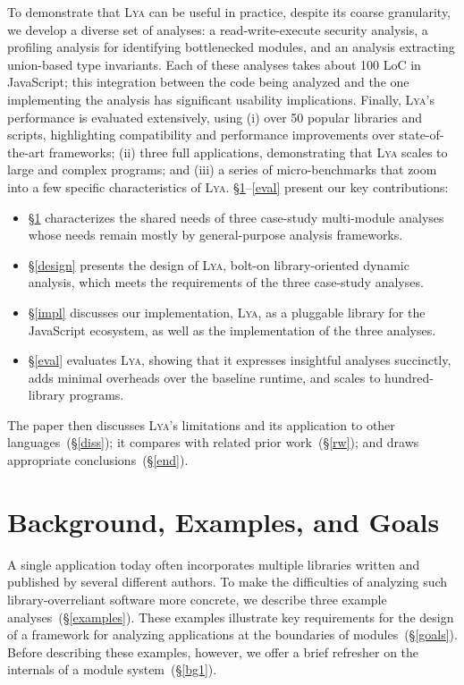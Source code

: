 \documentclass[letterpaper,twocolumn,10pt]{article}
\newcommand{\sx}[1]{(\S\ref{#1})}
\newcommand{\sys}{{\scshape Lya}\xspace}
\begin{document}
To demonstrate that \sys can be useful in practice, despite its coarse granularity, we develop a diverse set of analyses:
  a read-write-execute security analysis,
  a profiling analysis for identifying bottlenecked modules,
  and an analysis extracting union-based type invariants.
Each of these analyses takes about 100 LoC in JavaScript;
  this integration between the code being analyzed and the one implementing the analysis has significant usability implications.
Finally, \sys's performance is evaluated extensively, using
  (i) over 50 popular libraries and scripts, highlighting compatibility and performance improvements over state-of-the-art frameworks;
  (ii) three full applications, demonstrating that \sys scales to large and complex programs; and
  (iii) a series of micro-benchmarks that zoom into a few specific characteristics of \sys.
\S\ref{bg}--\ref{eval} present our key contributions:
\begin{itemize}
\item \S\ref{bg} characterizes the shared needs of three case-study multi-module analyses whose needs remain mostly by general-purpose analysis frameworks.
\item \S\ref{design} presents the design of \sys, bolt-on library-oriented dynamic analysis, which meets the requirements of the three case-study analyses.
\item \S\ref{impl} discusses our implementation, \sys, as a pluggable library for the JavaScript ecosystem, as well as the implementation of the three analyses.
\item \S\ref{eval} evaluates \sys, showing that it expresses insightful analyses succinctly, adds minimal overheads over the baseline runtime, and scales to hundred-library programs.
\end{itemize}
\noindent
The paper then discusses \sys's limitations and its application to other languages~\sx{diss};
  it compares with related prior work~\sx{rw};
  and draws appropriate conclusions~\sx{end}.

\section{Background, Examples, and Goals}
\label{bg}

A single application today often incorporates multiple libraries written and published by several different authors.
To make the difficulties of analyzing such library-overreliant software more concrete, we describe three example analyses~\sx{examples}.
These examples illustrate key requirements for the design of a framework for analyzing applications at the boundaries of modules~\sx{goals}.
Before describing these examples, however, we offer a brief refresher on the %
  internals of a module system~\sx{bg1}.
\end{document}
